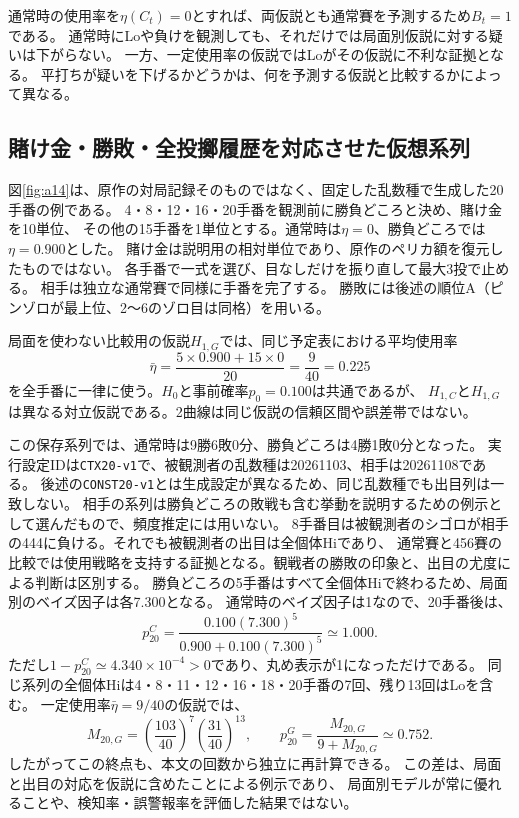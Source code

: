 \documentclass[11pt,a4paper]{article}
\numberwithin{equation}{section}
\begin{document}
通常時の使用率を$\eta(C_t)=0$とすれば、両仮説とも通常賽を予測するため$B_t=1$である。
通常時にLoや負けを観測しても、それだけでは局面別仮説に対する疑いは下がらない。
一方、一定使用率の仮説ではLoがその仮説に不利な証拠となる。
平打ちが疑いを下げるかどうかは、何を予測する仮説と比較するかによって異なる。

\clearpage
\subsection{賭け金・勝敗・全投擲履歴を対応させた仮想系列}
図\ref{fig:a14}は、原作の対局記録そのものではなく、固定した乱数種で生成した20手番の例である。
4・8・12・16・20手番を観測前に勝負どころと決め、賭け金を10単位、
その他の15手番を1単位とする。通常時は$\eta=0$、勝負どころでは$\eta=0.900$とした。
賭け金は説明用の相対単位であり、原作のペリカ額を復元したものではない。
各手番で一式を選び、目なしだけを振り直して最大3投で止める。
相手は独立な通常賽で同様に手番を完了する。
勝敗には後述の順位A（ピンゾロが最上位、2〜6のゾロ目は同格）を用いる。

局面を使わない比較用の仮説$H_{1,G}$では、同じ予定表における平均使用率
\[
\bar\eta=\frac{5\times0.900+15\times0}{20}=\frac9{40}=0.225
\]
を全手番に一律に使う。$H_0$と事前確率$p_0=0.100$は共通であるが、
$H_{1,C}$と$H_{1,G}$は異なる対立仮説である。2曲線は同じ仮説の信頼区間や誤差帯ではない。

この保存系列では、通常時は9勝6敗0分、勝負どころは4勝1敗0分となった。
実行設定IDは\texttt{CTX20-v1}で、被観測者の乱数種は20261103、相手は20261108である。
後述の\texttt{CONST20-v1}とは生成設定が異なるため、同じ乱数種でも出目列は一致しない。
相手の系列は勝負どころの敗戦も含む挙動を説明するための例示として選んだもので、頻度推定には用いない。
8手番目は被観測者のシゴロが相手の444に負ける。それでも被観測者の出目は全個体Hiであり、
通常賽と456賽の比較では使用戦略を支持する証拠となる。観戦者の勝敗の印象と、出目の尤度による判断は区別する。
勝負どころの5手番はすべて全個体Hiで終わるため、局面別のベイズ因子は各7.300となる。
通常時のベイズ因子は1なので、20手番後は、
\[
p_{20}^{C}=\frac{0.100(7.300)^5}{0.900+0.100(7.300)^5}\simeq1.000.
\]
ただし$1-p_{20}^{C}\simeq4.340\times10^{-4}>0$であり、丸め表示が1になっただけである。
同じ系列の全個体Hiは4・8・11・12・16・18・20手番の7回、残り13回はLoを含む。
一定使用率$\bar\eta=9/40$の仮説では、
\[
M_{20,G}=\left(\frac{103}{40}\right)^7\left(\frac{31}{40}\right)^{13},\qquad
p_{20}^{G}=\frac{M_{20,G}}{9+M_{20,G}}\simeq0.752.
\]
したがってこの終点も、本文の回数から独立に再計算できる。
この差は、局面と出目の対応を仮説に含めたことによる例示であり、
局面別モデルが常に優れることや、検知率・誤警報率を評価した結果ではない。
\end{document}
